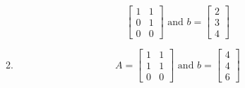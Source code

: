 \begin{enumerate}[label=(\alph*)]
\begin{enumerate}[label=(\arabic*)]
\begin{equation}
\begin{bmatrix}
                        1       &       1   \\
                        0       &       1   \\
                        0       &       0
                    \end{bmatrix}
                    \text{ and }
                    b =
                    \begin{bmatrix}
                        2       \\
                        3       \\
                        4
                    \end{bmatrix}
                \end{equation}
            \item 
                \begin{equation}
                    A = 
                    \begin{bmatrix}
                        1       &       1   \\
                        1       &       1   \\
                        0       &       0
                    \end{bmatrix}
                    \text{ and }
                    b =
                    \begin{bmatrix}
                        4       \\
                        4       \\
                        6
                    \end{bmatrix}
                \end{equation}
        \end{enumerate}
\end{enumerate}
